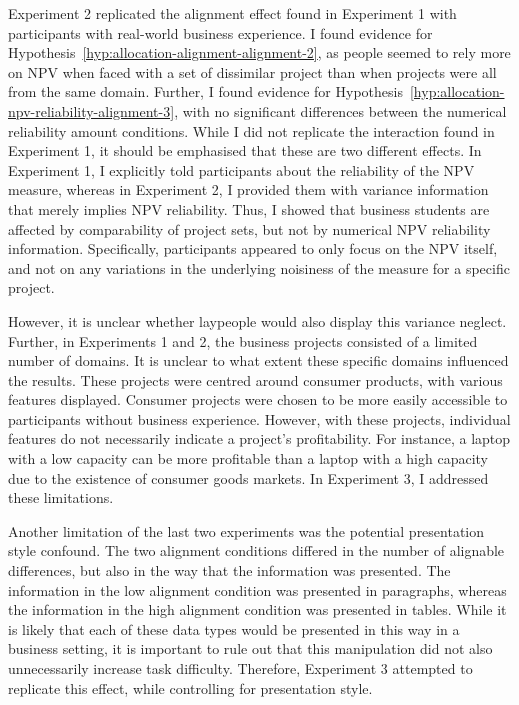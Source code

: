 \documentclass[a4paper, nobind, dvipsnames]{templates/ociamthesis}
\theoremstyle{definition}
\theoremstyle{definition}
\theoremstyle{definition}
\theoremstyle{definition}
\theoremstyle{remark}
\begin{document}
Experiment 2 replicated the alignment effect found in Experiment 1 with
participants with real-world business experience. I found evidence for
Hypothesis~\ref{hyp:allocation-alignment-alignment-2}, as people seemed to rely
more on NPV when faced with a set of dissimilar project than when projects were
all from the same domain. Further, I found evidence for
Hypothesis~\ref{hyp:allocation-npv-reliability-alignment-3}, with no
significant differences between the numerical reliability amount conditions.
While I did not replicate the interaction found in Experiment 1, it should be
emphasised that these are two different effects. In Experiment 1, I explicitly
told participants about the reliability of the NPV measure, whereas in
Experiment 2, I provided them with variance information that merely implies NPV
reliability. Thus, I showed that business students are affected by comparability
of project sets, but not by numerical NPV reliability information. Specifically,
participants appeared to only focus on the NPV itself, and not on any variations
in the underlying noisiness of the measure for a specific project.

However, it is unclear whether laypeople would also display this variance
neglect. Further, in Experiments 1 and 2, the business projects consisted of
a limited number of domains. It is unclear to what extent these specific domains
influenced the results. These projects were centred around consumer products,
with various features displayed. Consumer projects were chosen to be more easily
accessible to participants without business experience. However, with these
projects, individual features do not necessarily indicate a project's
profitability. For instance, a laptop with a low capacity can be more profitable
than a laptop with a high capacity due to the existence of consumer goods
markets. In Experiment 3, I addressed these limitations.

Another limitation of the last two experiments was the potential presentation
style confound. The two alignment conditions differed in the number of alignable
differences, but also in the way that the information was presented. The
information in the low alignment condition was presented in paragraphs, whereas
the information in the high alignment condition was presented in tables. While
it is likely that each of these data types would be presented in this way in a
business setting, it is important to rule out that this manipulation did not
also unnecessarily increase task difficulty. Therefore, Experiment 3 attempted
to replicate this effect, while controlling for presentation style.
\end{document}
